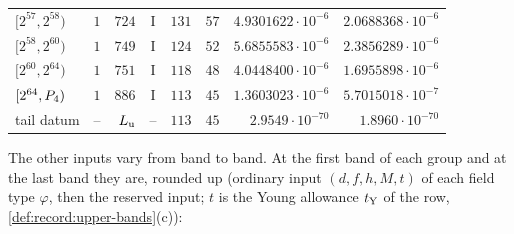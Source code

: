 {\begin{longtable}{@{}lrrcrrrr@{}}
$[2^{57},2^{58})$ & $1$ & $724$ & I & $131$ & $57$ & $4.9301622\cdot10^{-6}$ & $2.0688368\cdot10^{-6}$\\
$[2^{58},2^{60})$ & $1$ & $749$ & I & $124$ & $52$ & $5.6855583\cdot10^{-6}$ & $2.3856289\cdot10^{-6}$\\
$[2^{60},2^{64})$ & $1$ & $751$ & I & $118$ & $48$ & $4.0448400\cdot10^{-6}$ & $1.6955898\cdot10^{-6}$\\
$[2^{64},P_4)$ & $1$ & $886$ & I & $113$ & $45$ & $1.3603023\cdot10^{-6}$ & $5.7015018\cdot10^{-7}$\\
\midrule
tail datum & -- & $L_{\rm u}$ & -- & $113$ & $45$ & $2.9549\cdot10^{-70}$ & $1.8960\cdot10^{-70}$\\
\end{longtable}
}

The other inputs vary from band to band. At the first band of each group and at
the last band they are, rounded up (ordinary input $(d,f,h,M,t)$ of each field
type $\varphi$, then the reserved input; $t$ is the Young allowance $t_{\rm Y}$ of
the row, \cref{def:record:upper-bands}(c)):

